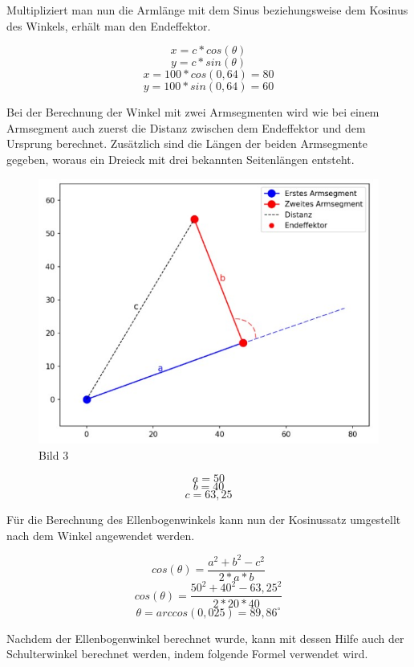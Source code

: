 \documentclass[12pt]{article}
\begin{document}
    Multipliziert man nun die Armlänge mit dem Sinus beziehungsweise dem Kosinus des Winkels, erhält
    man den Endeffektor.

    \[
        x=c * cos(\theta)
    \]
    \[
        y=c * sin(\theta)
    \]
    \[
        x=100 * cos(0,64)=80
    \]
    \[
        y=100 * sin(0,64)=60
    \]


    Bei der Berechnung der Winkel mit zwei Armsegmenten wird wie bei einem Armsegment auch zuerst
    die Distanz zwischen dem Endeffektor und dem Ursprung berechnet. Zusätzlich sind die Längen der
    beiden Armsegmente gegeben, woraus ein Dreieck mit drei bekannten Seitenlängen entsteht.

    \begin{figure}[h]
        \centering
        \includegraphics[width = \linewidth]{Bild 3}
        \caption{Bild 3}
    \end{figure}

    \[
        a=50
    \]
    \[
        b=40
    \]
    \[
        c=63,25
    \]

    Für die Berechnung des Ellenbogenwinkels kann nun der Kosinussatz umgestellt nach dem Winkel
    angewendet werden.

    \[
        cos(\theta)= \frac{a^2+b^2-c^2}{2*a*b}
    \]
    \[
        cos(\theta)= \frac{50^2+40^2-63,25^2}{2*20*40}
    \]
    \[
        \theta= arccos(0,025) = 89,86^\circ
    \]

    Nachdem der Ellenbogenwinkel berechnet wurde, kann mit dessen Hilfe auch der Schulterwinkel
    berechnet werden, indem folgende Formel verwendet wird.
\end{document}
